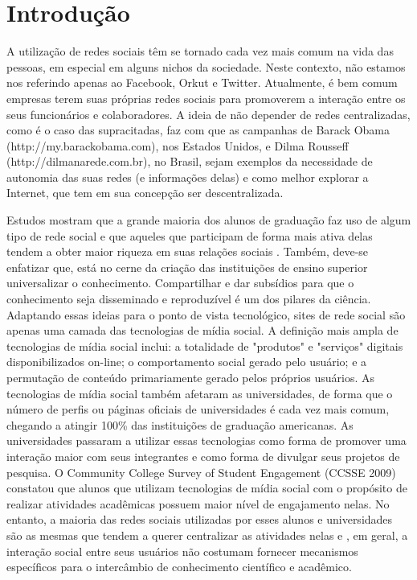 \chapter{Introdução}

A utilização de redes sociais têm se tornado cada vez mais comum na vida das pessoas, em especial em alguns nichos da sociedade. Neste contexto, não estamos nos referindo apenas ao Facebook, Orkut e Twitter. Atualmente, é bem comum empresas terem suas próprias redes sociais para promoverem a interação entre os seus funcionários e colaboradores. A ideia de não depender de redes centralizadas, como é o caso das supracitadas, faz com que as campanhas de Barack Obama (http://my.barackobama.com), nos Estados Unidos, e Dilma Rousseff (http://dilmanarede.com.br), no Brasil, sejam exemplos da necessidade de autonomia das suas redes (e informações delas) e como melhor explorar a Internet, que tem em sua concepção ser descentralizada.

Estudos mostram que a grande maioria dos alunos de graduação faz uso de algum tipo de rede social e que aqueles que participam de forma mais ativa delas tendem a obter maior riqueza em suas relações sociais . Também, deve-se enfatizar que, está no cerne da criação das instituições de ensino superior universalizar o conhecimento. Compartilhar e dar subsídios para que o conhecimento seja disseminado e reproduzível é um dos pilares da ciência. Adaptando essas ideias para o ponto de vista tecnológico, sites de rede social são apenas uma camada das tecnologias de mídia social. A definição mais ampla de tecnologias de mídia social inclui: a totalidade de "produtos" e "serviços" digitais disponibilizados on-line; o comportamento social gerado pelo usuário; e a permutação de conteúdo primariamente gerado pelos próprios usuários.
As tecnologias de mídia social também afetaram as universidades, de forma que o número de perfis ou páginas oficiais de universidades é cada vez mais comum, chegando a atingir 100\% das instituições de graduação americanas. As universidades passaram a utilizar essas tecnologias como forma de promover uma interação maior com seus integrantes e como forma de divulgar seus projetos de pesquisa. O Community College Survey of Student Engagement (CCSSE 2009) constatou que alunos que utilizam tecnologias de mídia social com o propósito de realizar atividades acadêmicas possuem maior nível de engajamento nelas. No entanto, a maioria das redes sociais utilizadas por esses alunos e universidades são as mesmas que tendem a querer centralizar as atividades nelas e , em geral, a interação social entre seus usuários não costumam fornecer mecanismos específicos para o intercâmbio de conhecimento científico e acadêmico.

